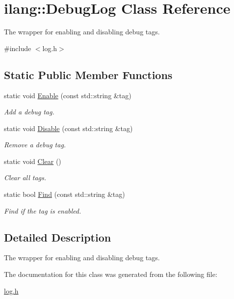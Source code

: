 \hypertarget{classilang_1_1_debug_log}{}\section{ilang\+:\+:Debug\+Log Class Reference}
\label{classilang_1_1_debug_log}


The wrapper for enabling and disabling debug tags.  




{\ttfamily \#include $<$log.\+h$>$}

\subsection*{Static Public Member Functions}
\begin{DoxyCompactItemize}
\item 
\mbox{\label{classilang_1_1_debug_log_a2ba071cf129b5fe3e8658b64e1bf70c8}} 
static void \mbox{\hyperlink{classilang_1_1_debug_log_a2ba071cf129b5fe3e8658b64e1bf70c8}{Enable}} (const std\+::string \&tag)
\begin{DoxyCompactList}\small\item\em Add a debug tag. \end{DoxyCompactList}\item 
\mbox{\label{classilang_1_1_debug_log_a9d5f9fcc26df22e2180a3ce486096464}} 
static void \mbox{\hyperlink{classilang_1_1_debug_log_a9d5f9fcc26df22e2180a3ce486096464}{Disable}} (const std\+::string \&tag)
\begin{DoxyCompactList}\small\item\em Remove a debug tag. \end{DoxyCompactList}\item 
\mbox{\label{classilang_1_1_debug_log_a1ab80bb7f59a4b0a8574db56e2bb5b65}} 
static void \mbox{\hyperlink{classilang_1_1_debug_log_a1ab80bb7f59a4b0a8574db56e2bb5b65}{Clear}} ()
\begin{DoxyCompactList}\small\item\em Clear all tags. \end{DoxyCompactList}\item 
\mbox{\label{classilang_1_1_debug_log_afed81c6e2e072a64e5e1e6ec2737172d}} 
static bool \mbox{\hyperlink{classilang_1_1_debug_log_afed81c6e2e072a64e5e1e6ec2737172d}{Find}} (const std\+::string \&tag)
\begin{DoxyCompactList}\small\item\em Find if the tag is enabled. \end{DoxyCompactList}\end{DoxyCompactItemize}


\subsection{Detailed Description}
The wrapper for enabling and disabling debug tags. 

The documentation for this class was generated from the following file\+:\begin{DoxyCompactItemize}
\item 
\mbox{\hyperlink{log_8h}{log.\+h}}\end{DoxyCompactItemize}
